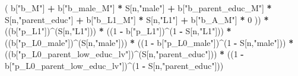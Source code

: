 \documentclass[
]{book}
\newenvironment{Shaded}{\begin{snugshade}}{\end{snugshade}}
\newcommand{\DecValTok}[1]{\textcolor[rgb]{0.00,0.00,0.81}{#1}}
\newcommand{\NormalTok}[1]{#1}
\newcommand{\SpecialCharTok}[1]{\textcolor[rgb]{0.81,0.36,0.00}{\textbf{#1}}}
\newcommand{\StringTok}[1]{\textcolor[rgb]{0.31,0.60,0.02}{#1}}
\begin{document}
\begin{Shaded}
\begin{Highlighting}[]
\NormalTok{          ( b[}\StringTok{"b\_M"}\NormalTok{] }\SpecialCharTok{+} 
\NormalTok{              b[}\StringTok{"b\_male\_M"}\NormalTok{] }\SpecialCharTok{*}\NormalTok{ S[n,}\StringTok{"male"}\NormalTok{] }\SpecialCharTok{+} 
\NormalTok{              b[}\StringTok{"b\_parent\_educ\_M"}\NormalTok{] }\SpecialCharTok{*}\NormalTok{ S[n,}\StringTok{"parent\_educ"}\NormalTok{] }\SpecialCharTok{+} 
\NormalTok{              b[}\StringTok{"b\_L1\_M"}\NormalTok{] }\SpecialCharTok{*}\NormalTok{ S[n,}\StringTok{"L1"}\NormalTok{] }\SpecialCharTok{+}
\NormalTok{              b[}\StringTok{"b\_A\_M"}\NormalTok{] }\SpecialCharTok{*} \DecValTok{0}\NormalTok{ )) }\SpecialCharTok{*} 
\NormalTok{      ((b[}\StringTok{"p\_L1"}\NormalTok{])}\SpecialCharTok{\^{}}\NormalTok{(S[n,}\StringTok{"L1"}\NormalTok{])) }\SpecialCharTok{*}
\NormalTok{      ((}\DecValTok{1} \SpecialCharTok{{-}}\NormalTok{ b[}\StringTok{"p\_L1"}\NormalTok{])}\SpecialCharTok{\^{}}\NormalTok{(}\DecValTok{1} \SpecialCharTok{{-}}\NormalTok{ S[n,}\StringTok{"L1"}\NormalTok{])) }\SpecialCharTok{*}
\NormalTok{      ((b[}\StringTok{"p\_L0\_male"}\NormalTok{])}\SpecialCharTok{\^{}}\NormalTok{(S[n,}\StringTok{"male"}\NormalTok{])) }\SpecialCharTok{*} 
\NormalTok{      ((}\DecValTok{1} \SpecialCharTok{{-}}\NormalTok{ b[}\StringTok{"p\_L0\_male"}\NormalTok{])}\SpecialCharTok{\^{}}\NormalTok{(}\DecValTok{1} \SpecialCharTok{{-}}\NormalTok{ S[n,}\StringTok{"male"}\NormalTok{])) }\SpecialCharTok{*} 
\NormalTok{      ((b[}\StringTok{"p\_L0\_parent\_low\_educ\_lv"}\NormalTok{])}\SpecialCharTok{\^{}}\NormalTok{(S[n,}\StringTok{"parent\_educ"}\NormalTok{])) }\SpecialCharTok{*}
\NormalTok{      ((}\DecValTok{1} \SpecialCharTok{{-}}\NormalTok{ b[}\StringTok{"p\_L0\_parent\_low\_educ\_lv"}\NormalTok{])}\SpecialCharTok{\^{}}\NormalTok{(}\DecValTok{1} \SpecialCharTok{{-}}\NormalTok{ S[n,}\StringTok{"parent\_educ"}\NormalTok{])) }
    

\end{Highlighting}
\end{Shaded}
\end{document}
